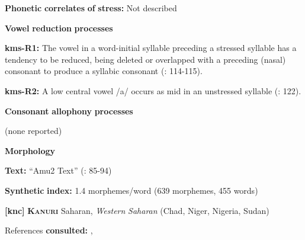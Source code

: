 \begin{styleBody}
\textbf{Phonetic} \textbf{correlates} \textbf{of} \textbf{stress:} Not described
\end{styleBody}

\begin{styleBody}
\textbf{Vowel} \textbf{reduction} \textbf{processes}
\end{styleBody}

\begin{styleBody}
\textbf{kms-R1:} The vowel in a word-initial syllable preceding a stressed syllable has a tendency to be reduced, being deleted or overlapped with a preceding (nasal) consonant to produce a syllabic consonant (\citealt{SandersSanders1980}: 114-115).
\end{styleBody}

\begin{styleBody}
\textbf{kms-R2:} A low central vowel /a/ occurs as mid in an unstressed syllable (\citealt{SandersSanders1980}: 122).
\end{styleBody}

\begin{styleBody}
\textbf{Consonant} \textbf{allophony} \textbf{processes}
\end{styleBody}

\begin{styleBody}
(none reported)
\end{styleBody}

\begin{styleBody}
\textbf{Morphology}
\end{styleBody}

\begin{styleBody}
\textbf{Text:} “Amu2 Text” (\citealt{SandersSanders1994}: 85-94)
\end{styleBody}

\begin{styleBody}
\textbf{Synthetic} \textbf{index:} 1.4 morphemes/word (639 morphemes, 455 words)
\end{styleBody}

\begin{styleBody}
\textbf{[knc]}   \textbf{\textsc{Kanuri}}    Saharan, \textit{Western} \textit{Saharan} (Chad, Niger, Nigeria, Sudan)
\end{styleBody}

\begin{styleBody}
References \textbf{consulted:} \citet{Cyffer1998}, \citet{Hutchison1981}
\end{styleBody}

